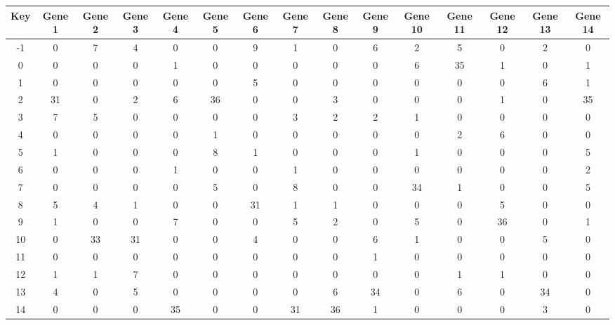 \begin{tabular}{|c|c|c|c|c|c|c|c|c|c|c|c|c|c|c|}
\hline
Key & Gene 1 & Gene 2 & Gene 3 & Gene 4 & Gene 5 & Gene 6 & Gene 7 & Gene 8 & Gene 9 & Gene 10 & Gene 11 & Gene 12 & Gene 13 & Gene 14 \\
\hline
-1 & 0 & 7 & 4 & 0 & 0 & 9 & 1 & 0 & 6 & 2 & 5 & 0 & 2 & 0 \\
0 & 0 & 0 & 0 & 1 & 0 & 0 & 0 & 0 & 0 & 6 & 35 & 1 & 0 & 1 \\
1 & 0 & 0 & 0 & 0 & 0 & 5 & 0 & 0 & 0 & 0 & 0 & 0 & 6 & 1 \\
2 & 31 & 0 & 2 & 6 & 36 & 0 & 0 & 3 & 0 & 0 & 0 & 1 & 0 & 35 \\
3 & 7 & 5 & 0 & 0 & 0 & 0 & 3 & 2 & 2 & 1 & 0 & 0 & 0 & 0 \\
4 & 0 & 0 & 0 & 0 & 1 & 0 & 0 & 0 & 0 & 0 & 2 & 6 & 0 & 0 \\
5 & 1 & 0 & 0 & 0 & 8 & 1 & 0 & 0 & 0 & 1 & 0 & 0 & 0 & 5 \\
6 & 0 & 0 & 0 & 1 & 0 & 0 & 1 & 0 & 0 & 0 & 0 & 0 & 0 & 2 \\
7 & 0 & 0 & 0 & 0 & 5 & 0 & 8 & 0 & 0 & 34 & 1 & 0 & 0 & 5 \\
8 & 5 & 4 & 1 & 0 & 0 & 31 & 1 & 1 & 0 & 0 & 0 & 5 & 0 & 0 \\
9 & 1 & 0 & 0 & 7 & 0 & 0 & 5 & 2 & 0 & 5 & 0 & 36 & 0 & 1 \\
10 & 0 & 33 & 31 & 0 & 0 & 4 & 0 & 0 & 6 & 1 & 0 & 0 & 5 & 0 \\
11 & 0 & 0 & 0 & 0 & 0 & 0 & 0 & 0 & 1 & 0 & 0 & 0 & 0 & 0 \\
12 & 1 & 1 & 7 & 0 & 0 & 0 & 0 & 0 & 0 & 0 & 1 & 1 & 0 & 0 \\
13 & 4 & 0 & 5 & 0 & 0 & 0 & 0 & 6 & 34 & 0 & 6 & 0 & 34 & 0 \\
14 & 0 & 0 & 0 & 35 & 0 & 0 & 31 & 36 & 1 & 0 & 0 & 0 & 3 & 0 \\
\hline
\end{tabular}